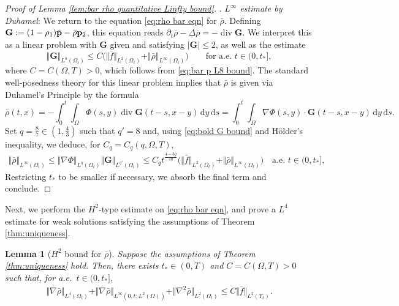 \documentclass[11pt,a4paper,reqno]{amsart}
\newtheorem{lemma}[prop]{Lemma}
\theoremstyle{remark}
\theoremstyle{definition}
\numberwithin{equation}{section}
\DeclareMathOperator{\dv}{div}
\newcommand{\p}{{\bf p}}
\renewcommand{\d}{\, \mathrm{d} }
\begin{document}
\begin{proof}[Proof of Lemma \ref{lem:bar rho quantitative Linfty bound}]
. \textit{$L^\infty$ estimate by Duhamel}: We return to the equation \eqref{eq:rho bar eqn} for $\bar{\rho}$. Defining $\mathbf{G} := (1-\rho_1)\bar{\p} - \bar{\rho} \p_2 $, this equation reads $\partial_t \bar{\rho} - \Delta \bar{\rho} = -\dv \mathbf{G}$. We interpret this as a linear problem with $\mathbf{G}$ given and satisfying $|\mathbf{G}| \leq 2$, as well as the estimate 
\begin{equation}\label{eq:bold G bound}
    \Vert \mathbf{G} \Vert_{L^8(\Omega_t)} \leq C \Big( \Vert \bar{f} \Vert_{L^2(\Omega_t)} + \Vert \bar{\rho} \Vert_{L^\infty(\Omega_t)} \Big) \qquad \text{for a.e.~} t \in (0,t_{*}], 
\end{equation}
where $C = C(\Omega,T)>0$, which follows from \eqref{eq:bar p L8 bound}. The standard well-posedness theory for this linear problem implies that $\bar{\rho}$ is given via Duhamel's Principle by the formula 
\begin{equation*}
    \bar{\rho}(t,x) = -\int_0^t \int_{\Omega} \Phi(s,y) \dv \mathbf{G}(t-s,x-y) \d y \d s = \int_0^t \int_{\Omega} \nabla \Phi(s,y) \! \cdot \! \mathbf{G}(t-s,x-y) \d y \d s. 
\end{equation*}
Set $q = \frac{8}{7} \in (1,\frac{4}{3})$ such that $q'=8$ and, using \eqref{eq:bold G bound} and H\"older's inequality, we deduce, for $C_q = C_q(q,\Omega,T)$, 
\begin{equation*}
    \begin{aligned}
        \Vert \bar{\rho}\Vert_{L^\infty(\Omega_t)} \leq \Vert \nabla \Phi \Vert_{L^q(\Omega_t)} \Vert \mathbf{G} \Vert_{L^{q'}(\Omega_t)} \leq C_q t^{\frac{4-3q}{2q}} \Big( \Vert \bar{f} \Vert_{L^2(\Omega_t)} + \Vert \bar{\rho} \Vert_{L^\infty(\Omega_t)} \Big) \quad \text{a.e.~}t \in (0,t_*], 
    \end{aligned}
\end{equation*}
Restricting $t_*$ to be smaller if necessary, we absorb the final term and conclude. 
\end{proof}



Next, we perform the $H^2$-type estimate on \eqref{eq:rho bar eqn}, and prove a $L^4$ estimate for weak solutions satisfying the assumptions of Theorem \ref{thm:uniqueness}.

\begin{lemma}[$H^2$ bound for $\bar{\rho}$]\label{lem:H2 bar rho}
    Suppose the assumptions of Theorem \ref{thm:uniqueness} hold. Then, there exists $t_* \in (0,T)$ and $C=C(\Omega,T)>0$ such that, for a.e.~$t \in (0,t_*]$, 
    \begin{equation*}
\begin{aligned}
  \Vert \nabla \bar{\rho} \Vert_{L^4(\Omega_t)} + \Vert \nabla \bar{\rho} \Vert_{L^\infty(0,t;L^2(\Omega))} + \Vert \nabla^2 \bar{\rho}\Vert_{L^2(\Omega_t)}  \leq C  \Vert \bar{f}\Vert_{L^2(\Upsilon_t)}. 
   \end{aligned}
\end{equation*}  
\end{lemma}
\end{document}
